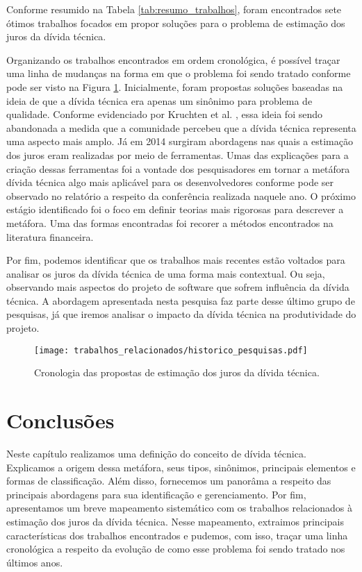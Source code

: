 Conforme resumido na Tabela \ref{tab:resumo_trabalhos}, foram encontrados sete ótimos trabalhos focados em propor soluções para o problema de estimação dos juros da dívida técnica. 

Organizando os trabalhos encontrados em ordem cronológica, é possível traçar uma linha de mudanças na forma em que o problema foi sendo tratado conforme pode ser visto na Figura \ref{fig:historico_pesquisas}. Inicialmente, foram propostas soluções baseadas na ideia de que a dívida técnica era apenas um sinônimo para problema de qualidade. Conforme evidenciado por Kruchten et al. \cite{kruchten2013technical}, essa ideia foi sendo abandonada a medida que a comunidade percebeu que a dívida técnica representa uma aspecto mais amplo. Já em 2014 surgiram abordagens nas quais a estimação dos juros eram realizadas por meio de ferramentas. Umas das explicações para a criação dessas ferramentas foi a vontade dos pesquisadores em tornar a metáfora dívida técnica algo mais aplicável para os desenvolvedores conforme pode ser observado no relatório a respeito da conferência realizada naquele ano\cite{falessi2014technical}.  O próximo estágio identificado foi o foco em definir teorias mais rigorosas para descrever a metáfora. Uma das formas encontradas foi recorer a métodos encontrados na literatura financeira. 

Por fim, podemos identificar que os trabalhos mais recentes estão voltados para analisar os juros da dívida técnica de uma forma mais contextual. Ou seja, observando mais aspectos do projeto de software que sofrem influência da dívida técnica. A abordagem apresentada nesta pesquisa faz parte desse último grupo de pesquisas, já que iremos analisar o impacto da dívida técnica na produtividade do projeto.



 \begin{figure}[H]
  \centering
  \texttt{[image: trabalhos\_relacionados/historico\_pesquisas.pdf]}
  \caption{Cronologia das propostas de estimação dos juros da dívida técnica.}
  \label{fig:historico_pesquisas} 
\end{figure}


\section{Conclusões}

Neste capítulo realizamos uma definição do conceito de dívida técnica. Explicamos a origem dessa metáfora, seus tipos, sinônimos, principais elementos e formas de classificação. Além disso, fornecemos um panorâma a respeito das principais abordagens para sua identificação e  gerenciamento.  Por fim, apresentamos um breve mapeamento sistemático com os trabalhos relacionados à estimação dos juros da dívida técnica. Nesse mapeamento, extraimos  principais características dos trabalhos encontrados e pudemos, com isso, traçar uma linha cronológica a respeito da evolução de como esse problema foi sendo tratado nos últimos anos.










